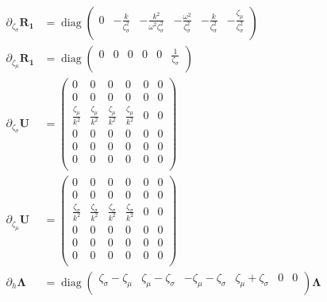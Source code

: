 \documentclass[a4paper,10pt]{article}
\DeclareMathOperator{\diag}{diag}
\begin{document}
\begin{align}
\partial_{\zeta_\sigma} \mathbf{R_1} &=\diag \left(
\begin{array}{cccccc}
 0 & -\frac{k}{\zeta _{\sigma }^2} & -\frac{k^2}{\omega ^2 \zeta _{\sigma }^2} & -\frac{\omega ^2}{\zeta _{\sigma }^2} & -\frac{k}{\zeta _{\sigma }^2}  & -\frac{\zeta _{\mu }}{\zeta _{\sigma }^2} \\
\end{array}
\right)\\
\partial_{\zeta_\mu} \mathbf{R_1} &=\diag\left(
\begin{array}{cccccc}
 0 & 0 & 0 & 0 & 0 & \frac{1}{\zeta _{\sigma }} \\
\end{array}
\right)\\
\partial_{\zeta_\sigma}\mathbf{U}&=\left(
\begin{array}{cccccc}
 0 & 0 & 0 & 0 & 0 & 0 \\
 0 & 0 & 0 & 0 & 0 & 0 \\
 \frac{\zeta _{\mu }}{k^2} & \frac{\zeta _{\mu }}{k^2} & \frac{\zeta _{\mu }}{k^2} & \frac{\zeta _{\mu }}{k^2} & 0
   & 0 \\
 0 & 0 & 0 & 0 & 0 & 0 \\
 0 & 0 & 0 & 0 & 0 & 0 \\
 0 & 0 & 0 & 0 & 0 & 0 \\
\end{array}
\right)\\
\partial_{\zeta_\mu}\mathbf{U}&=\left(
\begin{array}{cccccc}
 0 & 0 & 0 & 0 & 0 & 0 \\
 0 & 0 & 0 & 0 & 0 & 0 \\
 \frac{\zeta _{\sigma }}{k^2} & \frac{\zeta _{\sigma }}{k^2} & \frac{\zeta _{\sigma }}{k^2} & \frac{\zeta _{\sigma }}{k^2} & 0
   & 0 \\
 0 & 0 & 0 & 0 & 0 & 0 \\
 0 & 0 & 0 & 0 & 0 & 0 \\
 0 & 0 & 0 & 0 & 0 & 0 \\
\end{array}
\right)\\
\partial_h \mathbf{\Lambda} &=\diag \left(
\begin{array}{cccccc}
 \zeta _{\sigma }-\zeta _{\mu } & \zeta _{\mu }-\zeta _{\sigma } & -\zeta _{\mu }-\zeta _{\sigma } & \zeta _{\mu
   }+\zeta _{\sigma } & 0 & 0 \\
\end{array}
\right)\mathbf{\Lambda}\\

\end{align}
\end{document}
